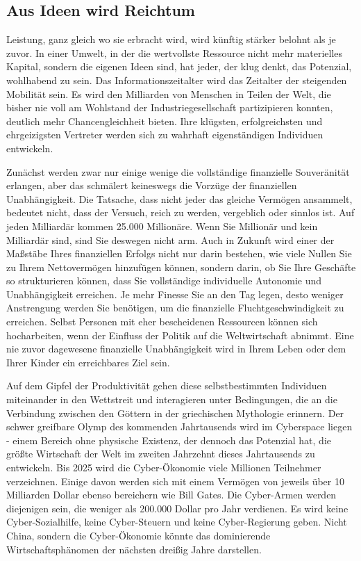 \documentclass[
  a5paper,
  smalldemyvopaper,10pt,twoside,onecolumn,openright,extrafontsizes,hidelinks]{memoir}
\begin{document}
\subsection{Aus Ideen wird Reichtum}\label{aus-ideen-wird-reichtum}

Leistung, ganz gleich wo sie erbracht wird, wird künftig stärker belohnt
als je zuvor. In einer Umwelt, in der die wertvollste Ressource nicht
mehr materielles Kapital, sondern die eigenen Ideen sind, hat jeder, der
klug denkt, das Potenzial, wohlhabend zu sein. Das Informationszeitalter
wird das Zeitalter der steigenden Mobilität sein. Es wird den Milliarden
von Menschen in Teilen der Welt, die bisher nie voll am Wohlstand der
Industriegesellschaft partizipieren konnten, deutlich mehr
Chancengleichheit bieten. Ihre klügsten, erfolgreichsten und
ehrgeizigsten Vertreter werden sich zu wahrhaft eigenständigen
Individuen entwickeln.

Zunächst werden zwar nur einige wenige die vollständige finanzielle
Souveränität erlangen, aber das schmälert keineswegs die Vorzüge der
finanziellen Unabhängigkeit. Die Tatsache, dass nicht jeder das gleiche
Vermögen ansammelt, bedeutet nicht, dass der Versuch, reich zu werden,
vergeblich oder sinnlos ist. Auf jeden Milliardär kommen 25.000
Millionäre. Wenn Sie Millionär und kein Milliardär sind, sind Sie
deswegen nicht arm. Auch in Zukunft wird einer der Maßstäbe Ihres
finanziellen Erfolgs nicht nur darin bestehen, wie viele Nullen Sie zu
Ihrem Nettovermögen hinzufügen können, sondern darin, ob Sie Ihre
Geschäfte so strukturieren können, dass Sie vollständige individuelle
Autonomie und Unabhängigkeit erreichen. Je mehr Finesse Sie an den Tag
legen, desto weniger Anstrengung werden Sie benötigen, um die
finanzielle Fluchtgeschwindigkeit zu erreichen. Selbst Personen mit eher
bescheidenen Ressourcen können sich hocharbeiten, wenn der Einfluss der
Politik auf die Weltwirtschaft abnimmt. Eine nie zuvor dagewesene
finanzielle Unabhängigkeit wird in Ihrem Leben oder dem Ihrer Kinder ein
erreichbares Ziel sein.

Auf dem Gipfel der Produktivität gehen diese selbstbestimmten Individuen
miteinander in den Wettstreit und interagieren unter Bedingungen, die an
die Verbindung zwischen den Göttern in der griechischen Mythologie
erinnern. Der schwer greifbare Olymp des kommenden Jahrtausends wird im
Cyberspace liegen - einem Bereich ohne physische Existenz, der dennoch
das Potenzial hat, die größte Wirtschaft der Welt im zweiten Jahrzehnt
dieses Jahrtausends zu entwickeln. Bis 2025 wird die Cyber-Ökonomie
viele Millionen Teilnehmer verzeichnen. Einige davon werden sich mit
einem Vermögen von jeweils über 10 Milliarden Dollar ebenso bereichern
wie Bill Gates. Die Cyber-Armen werden diejenigen sein, die weniger als
200.000 Dollar pro Jahr verdienen. Es wird keine Cyber-Sozialhilfe,
keine Cyber-Steuern und keine Cyber-Regierung geben. Nicht China,
sondern die Cyber-Ökonomie könnte das dominierende Wirtschaftsphänomen
der nächsten dreißig Jahre darstellen.
\end{document}
